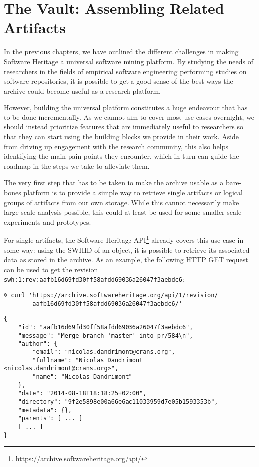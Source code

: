 \chapter{The Vault: Assembling Related Artifacts}

In the previous chapters, we have outlined the different challenges in making
Software Heritage a universal software mining platform. By studying the needs
of researchers in the fields of empirical software engineering performing
studies on software repositories, it is possible to get a good sense of the
best ways the archive could become useful as a research platform.

However, building the universal platform constitutes a huge endeavour that has
to be done incrementally. As we cannot aim to cover most use-cases overnight,
we should instead prioritize features that are immediately useful to
researchers so that they can start using the building blocks we provide in
their work. Aside from driving up engagement with the research community, this
also helps identifying the main pain points they encounter, which in turn can
guide the roadmap in the steps we take to alleviate them.

The very first step that has to be taken to make the archive usable as a
bare-bones platform is to provide a simple way to retrieve single artifacts or
logical groups of artifacts from our own storage. While this cannot necessarily
make large-scale analysis possible, this could at least be used for some
smaller-scale experiments and prototypes.

For single artifacts, the Software Heritage
API\footnote{\url{https://archive.softwareheritage.org/api/}} already covers
this use-case in some way: using the \gls{SWHID} of an object, it is possible
to retrieve its associated data as stored in the archive. As an example, the
following HTTP GET request can be used to get the revision
\texttt{swh:1:rev:aafb16d69fd30ff58afdd69036a26047f3aebdc6}:

\begin{minipage}{0.96\textwidth}
\begin{verbatim}
% curl 'https://archive.softwareheritage.org/api/1/revision/
        aafb16d69fd30ff58afdd69036a26047f3aebdc6/'
\end{verbatim}
\begin{verbatim}
{
    "id": "aafb16d69fd30ff58afdd69036a26047f3aebdc6",
    "message": "Merge branch 'master' into pr/584\n",
    "author": {
        "email": "nicolas.dandrimont@crans.org",
        "fullname": "Nicolas Dandrimont <nicolas.dandrimont@crans.org>",
        "name": "Nicolas Dandrimont"
    },
    "date": "2014-08-18T18:18:25+02:00",
    "directory": "9f2e5898e00a66e6ac11033959d7e05b1593353b",
    "metadata": {},
    "parents": [ ... ]
    [ ... ]
}
\end{verbatim}
\end{minipage}

